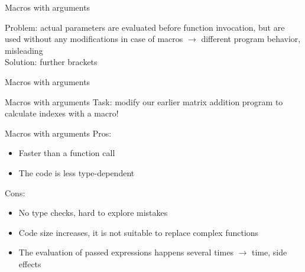 \documentclass[usenames,dvipsnames,aspectratio=169]{beamer}
\begin{document}
\begin{frame}{Macros with arguments}
  \scriptsize
  \begin{exampleblock}{}
    \vspace{-.3cm}
    
    \vspace{-.3cm}
  \end{exampleblock}
  \vfill
  Problem: actual parameters are evaluated before function invocation, but are used without any modifications in case of macros $\to$ different program behavior, misleading\\
  Solution: further brackets
\end{frame}

\begin{frame}{Macros with arguments}
  \scriptsize
  \begin{exampleblock}{}
    
  \end{exampleblock}
\end{frame}

\begin{frame}{Macros with arguments}
  Task: modify our earlier matrix addition program to calculate indexes with a macro!
  \scriptsize
  \begin{exampleblock}{}
    
  \end{exampleblock}
\end{frame}

\begin{frame}{Macros with arguments}
  Pros:
  \begin{itemize}
    \item Faster than a function call
    \item The code is less type-dependent
  \end{itemize}
  \vfill
  Cons:
  \begin{itemize}
    \item No type checks, hard to explore mistakes
    \item Code size increases, it is not suitable to replace complex functions
    \item The evaluation of passed expressions happens several times $\to$ time, side effects
  \end{itemize}
\end{frame}
\end{document}
